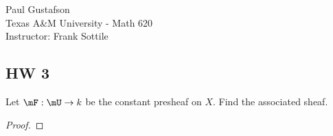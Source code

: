 \documentclass{article}
\begin{document}
\noindent Paul Gustafson\\
\noindent Texas A\&M University - Math 620\\ 
\noindent Instructor: Frank Sottile

\subsection*{HW 3}
 Let $\mF: \mU \to k$ be the constant presheaf on $X$.  Find the associated sheaf.
\begin{proof}
\end{proof}
\end{document}
